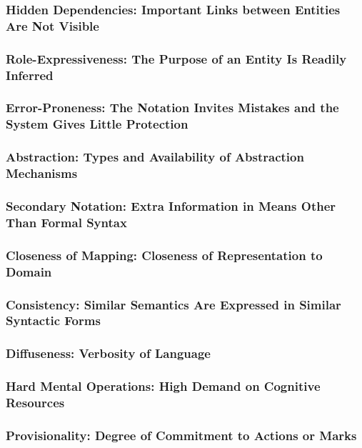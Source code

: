 \documentclass[screen, sigcconf]{timtm}
\begin{document}
\subsubsection{Hidden Dependencies: Important Links between Entities Are Not Visible}

\subsubsection{Role-Expressiveness: The Purpose of an Entity Is Readily Inferred}

\subsubsection{Error-Proneness: The Notation Invites Mistakes and the System Gives Little Protection}

\subsubsection{Abstraction: Types and Availability of Abstraction Mechanisms}

\subsubsection{Secondary Notation: Extra Information in Means Other Than Formal Syntax}

\subsubsection{Closeness of Mapping: Closeness of Representation to Domain}

\subsubsection{Consistency: Similar Semantics Are Expressed in Similar Syntactic Forms}

\subsubsection{Diffuseness: Verbosity of Language}

\subsubsection{Hard Mental Operations: High Demand on Cognitive Resources}

\subsubsection{Provisionality: Degree of Commitment to Actions or Marks}
\end{document}

